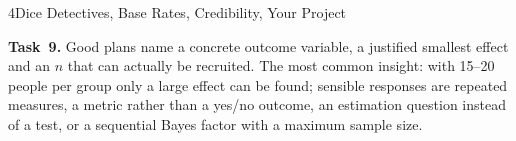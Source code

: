 \begin{uebungsblattb}{4}{Dice Detectives, Base Rates, Credibility, Your Project}
\begin{lehrhinweis}
\textbf{Task~9.} Good plans name a concrete outcome variable, a justified
smallest effect and an $n$ that can actually be recruited. The most
common insight: with 15--20 people per group only a large effect can be
found; sensible responses are repeated measures, a metric rather than a
yes/no outcome, an estimation question instead of a test, or a
sequential Bayes factor with a maximum sample size.
\end{lehrhinweis}
\end{uebungsblattb}

